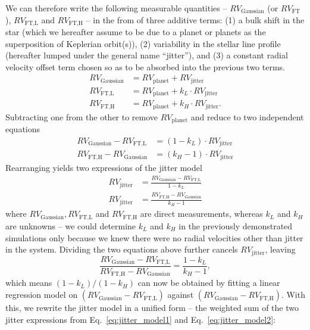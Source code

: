 We can therefore write the following measurable quantities -- $RV_\text{Gaussian}$ (or $RV_\text{FT}$), $RV_\text{FT,L}$ and $RV_\text{FT,H}$ -- in the from of three additive terms: (1) a bulk shift in the star (which we hereafter assume to be due to a planet or planets as the superposition of Keplerian orbit(s)), (2) variability in the stellar line profile (hereafter lumped under the general name ``jitter''), and (3) a constant radial velocity offset term chosen so as to be absorbed into the previous two terms.
\begin{align}
	RV_\text{Gaussian} 	&= RV_\text{planet} + RV_\text{jitter}				 \label{eq:RV_Gau} \\
	RV_\text{FT,L} 		&= RV_\text{planet} + k_L \cdot RV_\text{jitter} 		 \label{eq:RV_FTL} \\
	RV_\text{FT,H} 		&= RV_\text{planet} + k_H \cdot RV_\text{jitter}.		 \label{eq:RV_FTH}
\end{align}
Subtracting one from the other to remove $RV_\text{planet}$ and reduce to two independent equations
\begin{align}
	RV_\text{Gaussian} - RV_\text{FT,L} 	&= (1-k_L) \cdot RV_\text{jitter}\\
	RV_\text{FT,H} - RV_\text{Gaussian}	&= (k_H-1) \cdot RV_\text{jitter}
\end{align}
Rearranging yields two expressions of the jitter model
\begin{align}
	RV_\text{jitter} &= \frac{RV_\text{Gaussian} - RV_\text{FT,L}}{1-k_L} 	\label{eq:jitter_model1} \\
	RV_\text{jitter} &= \frac{RV_\text{FT,H} - RV_\text{Gaussian}}{k_H-1}		\label{eq:jitter_model2} 
\end{align}
where $RV_\text{Gaussian}, RV_\text{FT,L}$ and $RV_\text{FT,H}$ are direct measurements, whereas $k_L$ and $k_H$ are unknowns -- we could determine $k_L$ and $k_H$ in the previously demonstrated simulations only because we knew there were no radial velocities other than jitter in the system. Dividing the two equations above further cancels $RV_\text{jitter}$, leaving 
\begin{equation}
	\frac{RV_\text{Gaussian}-RV_\text{FT,L}}{RV_\text{FT,H} - RV_\text{Gaussian}} = \frac{1-k_L}{k_H-1},
\label{eq:GHL} 
\end{equation}
which means $(1-k_L)/(1-k_H)$ can now be obtained by fitting a linear regression model on $(RV_\text{Gaussian}-RV_\text{FT,L})$ against $(RV_\text{Gaussian} - RV_\text{FT,H})$. With this, we rewrite the jitter model in a unified form -- the weighted sum of the two jitter expressions from Eq.~\ref{eq:jitter_model1} and Eq.~\ref{eq:jitter_model2}: 
